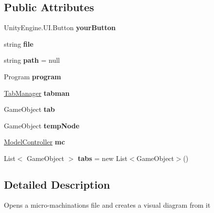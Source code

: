 \subsection*{Public Attributes}
\begin{DoxyCompactItemize}
\item 
\mbox{\label{class_open_file_script_a350ae639143fb60f7ae57729656dc12d}} 
Unity\+Engine.\+U\+I.\+Button {\bfseries your\+Button}
\item 
\mbox{\label{class_open_file_script_aee899fa35c56029fae604c45669e7b3d}} 
string {\bfseries file}
\item 
\mbox{\label{class_open_file_script_af58aa31852b32428025ff87c9b1a4166}} 
string {\bfseries path} = null
\item 
\mbox{\label{class_open_file_script_a139b85dfc4933e180ed34cd7152bd19a}} 
Program {\bfseries program}
\item 
\mbox{\label{class_open_file_script_ab7b1ffe8e6c4fb6e38c8969e664728b5}} 
\hyperlink{class_tab_manager}{Tab\+Manager} {\bfseries tabman}
\item 
\mbox{\label{class_open_file_script_a8cdf361b25e255e1c4b810dcd94f6893}} 
Game\+Object {\bfseries tab}
\item 
\mbox{\label{class_open_file_script_aef81c0cdf4e8ffa21ab35a6544f69d6c}} 
Game\+Object {\bfseries temp\+Node}
\item 
\mbox{\label{class_open_file_script_ab553f0a078a9f4a6bb3428123da5f376}} 
\hyperlink{class_model_controller}{Model\+Controller} {\bfseries mc}
\item 
\mbox{\label{class_open_file_script_a35f21e09c99790fc9d874a90e4313ed5}} 
List$<$ Game\+Object $>$ {\bfseries tabs} = new List$<$Game\+Object$>$()
\end{DoxyCompactItemize}


\subsection{Detailed Description}
Opens a micro-\/machinations file and creates a visual diagram from it 




